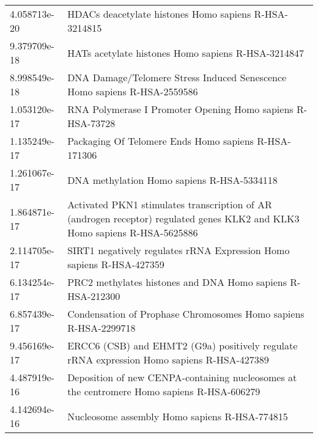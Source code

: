 \begin{longtable}{p{2.4cm}p{14.5cm}}
\bottomrule
\endlastfoot
             4.058713e-20 &                                                                                 HDACs deacetylate histones Homo sapiens R-HSA-3214815 \\
             9.379709e-18 &                                                                                    HATs acetylate histones Homo sapiens R-HSA-3214847 \\
             8.998549e-18 &                                                              DNA Damage/Telomere Stress Induced Senescence Homo sapiens R-HSA-2559586 \\
             1.053120e-17 &                                                                            RNA Polymerase I Promoter Opening Homo sapiens R-HSA-73728 \\
             1.135249e-17 &                                                                                  Packaging Of Telomere Ends Homo sapiens R-HSA-171306 \\
             1.261067e-17 &                                                                                            DNA methylation Homo sapiens R-HSA-5334118 \\
             1.864871e-17 &            Activated PKN1 stimulates transcription of AR (androgen receptor) regulated genes KLK2 and KLK3 Homo sapiens R-HSA-5625886 \\
             2.114705e-17 &                                                                  SIRT1 negatively regulates rRNA Expression Homo sapiens R-HSA-427359 \\
             6.134254e-17 &                                                                            PRC2 methylates histones and DNA Homo sapiens R-HSA-212300 \\
             6.857439e-17 &                                                                       Condensation of Prophase Chromosomes Homo sapiens R-HSA-2299718 \\
             9.456169e-17 &                                             ERCC6 (CSB) and EHMT2 (G9a) positively regulate rRNA expression Homo sapiens R-HSA-427389 \\
             4.487919e-16 &                                            Deposition of new CENPA-containing nucleosomes at the centromere Homo sapiens R-HSA-606279 \\
             4.142694e-16 &                                                                                         Nucleosome assembly Homo sapiens R-HSA-774815 \\

\end{longtable}
